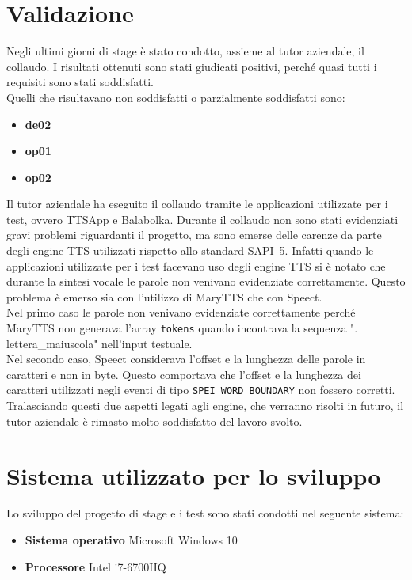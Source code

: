 \section{Validazione}
Negli ultimi giorni di stage è stato condotto, assieme al tutor aziendale, il collaudo.
I risultati ottenuti sono stati giudicati positivi, perché quasi tutti i requisiti sono stati soddisfatti.\\
Quelli che risultavano non soddisfatti o parzialmente soddisfatti sono:
\begin{itemize}
	\item \textbf{de02}
	\item \textbf{op01}
	\item \textbf{op02}
\end{itemize}
Il tutor aziendale ha eseguito il collaudo tramite le applicazioni utilizzate per i test, ovvero TTSApp e Balabolka.
Durante il collaudo non sono stati evidenziati gravi problemi riguardanti il progetto, ma sono emerse delle carenze da parte degli engine TTS utilizzati rispetto allo standard SAPI~5.
Infatti quando le applicazioni utilizzate per i test facevano uso degli engine TTS si è notato che durante la sintesi vocale le parole non venivano evidenziate correttamente.
Questo problema è emerso sia con l'utilizzo di MaryTTS che con Speect.\\
Nel primo caso le parole non venivano evidenziate correttamente perché MaryTTS non generava l'array \texttt{tokens} quando incontrava la sequenza ". lettera\_maiuscola" nell'input testuale.\\
Nel secondo caso, Speect considerava l'offset e la lunghezza delle parole in caratteri e non in byte. Questo comportava che l'offset e la lunghezza dei caratteri utilizzati negli eventi di tipo \texttt{SPEI\_WORD\_BOUNDARY} non fossero corretti.\\
Tralasciando questi due aspetti legati agli engine, che verranno risolti in futuro, il tutor aziendale è rimasto molto soddisfatto del lavoro svolto.

\section{Sistema utilizzato per lo sviluppo}
Lo sviluppo del progetto di stage e i test sono stati condotti nel seguente sistema:
\begin{itemize}
	\item \textbf{Sistema operativo} Microsoft Windows 10
	\item \textbf{Processore} Intel i7-6700HQ
\end{itemize}


